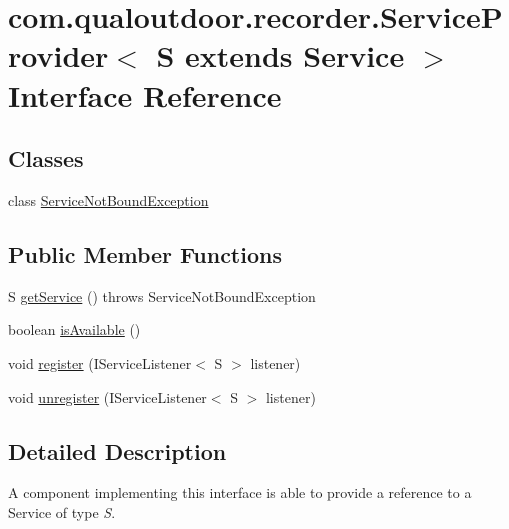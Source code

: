 \hypertarget{interfacecom_1_1qualoutdoor_1_1recorder_1_1ServiceProvider_3_01S_01extends_01Service_01_4}{\section{com.\-qualoutdoor.\-recorder.\-Service\-Provider$<$ S extends Service $>$ Interface Reference}
\label{interfacecom_1_1qualoutdoor_1_1recorder_1_1ServiceProvider_3_01S_01extends_01Service_01_4}
}
\subsection*{Classes}
\begin{DoxyCompactItemize}
\item 
class \hyperlink{classcom_1_1qualoutdoor_1_1recorder_1_1ServiceProvider_3_01S_01extends_01Service_01_4_1_1ServiceNotBoundException}{Service\-Not\-Bound\-Exception}
\end{DoxyCompactItemize}
\subsection*{Public Member Functions}
\begin{DoxyCompactItemize}
\item 
S \hyperlink{interfacecom_1_1qualoutdoor_1_1recorder_1_1ServiceProvider_3_01S_01extends_01Service_01_4_abd18d0427c9445ea8cd5b06902566764}{get\-Service} ()  throws Service\-Not\-Bound\-Exception
\item 
boolean \hyperlink{interfacecom_1_1qualoutdoor_1_1recorder_1_1ServiceProvider_3_01S_01extends_01Service_01_4_a2966ed2b8597950b55d6d3c18dc26e64}{is\-Available} ()
\item 
void \hyperlink{interfacecom_1_1qualoutdoor_1_1recorder_1_1ServiceProvider_3_01S_01extends_01Service_01_4_aeb41573904453af9b932f253d3392b5c}{register} (I\-Service\-Listener$<$ S $>$ listener)
\item 
void \hyperlink{interfacecom_1_1qualoutdoor_1_1recorder_1_1ServiceProvider_3_01S_01extends_01Service_01_4_a542edd6bf1fea27559fc4f8cfc11e700}{unregister} (I\-Service\-Listener$<$ S $>$ listener)
\end{DoxyCompactItemize}


\subsection{Detailed Description}
A component implementing this interface is able to provide a reference to a Service of type {\itshape S}.

